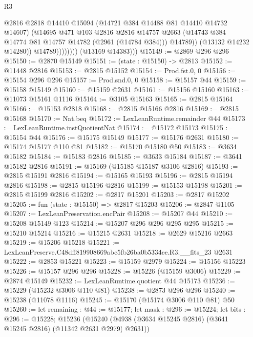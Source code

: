 \begin{lexlean}{R3}
\begin{coremodule}
                            @2816
                            @2818
                            @14410
                            @15094
                            (@14721 @384 @14488 @81 @14410 @14732 @14607)
                            (@14695
                              @471
                              @103
                              @2816
                              @2816
                              @14757
                              @2663
                              (@14743 @384 @14774 @81 @14757 @14782 (@2961 (@14784 @384)))
                              @14789))
                          (@13132 @14232 @14280))
                        @14789))))))))
        (@13169 @14383)))
@15149 := @2869 @296 @296
@15150 := @2870 @15149
@15151 := (state : @15150) -> @2813
@15152 := @11448 @2816
@15153 := @2815 @15152
@15154 := Prod.fst.{0, 0}
@15156 := @15154 @296 @296
@15157 := Prod.snd.{0, 0}
@15158 := @15157 @44
@15159 := @15158 @15149
@15160 := @15159 @2631
@15161 := @15156 @15160
@15163 := @11073 @15161 @1116
@15164 := @3105 @15163
@15165 := @2815 @15164
@15166 := @15153 @2818
@15168 := @2815 @15166 @2816
@15169 := @2815 @15168
@15170 := Nat.beq
@15172 := LexLeanRuntime.remainder @44
@15173 := LexLeanRuntime.instQuotientNat
@15174 := @15172 @15173
@15175 := @15154 @44
@15176 := @15175 @15149
@15177 := @15176 @2631
@15180 := @15174 @15177 @110 @81
@15182 := @15170 @15180 @50
@15183 := @3634 @15182
@15184 := @15183 @2816
@15185 := @3633 @15184
@15187 := @3641 @15182 @2816
@15191 := @15169 (@15185 @15187 @3106 @2816)
@15193 := @2815 @15191 @2816
@15194 := @15165 @15193
@15196 := @2815 @15194 @2816
@15198 := @2815 @15196 @2816
@15199 := @15153 @15198
@15201 := @2815 @15199 @2816
@15202 := @2817 @15201
@15203 := @2817 @15202
@15205 := fun (state : @15150) => @2817 @15203
@15206 := @2847 @1105
@15207 := LexLeanPreservation.encPair
@15208 := @15207 @44
@15210 := @15208 @15149 @123
@15214 := @15207 @296 @296 @295 @295
@15215 := @15210 @15214
@15216 := @15215 @2631
@15218 := @2629 @15216 @2663
@15219 := @15206 @15218
@15221 := LexLeanPreserve.C48dff819908669abc5fb26ba0b5334ce.R3.__fits_23 @2631
@15222 := @2853 @15221
@15223 := @15159 @2979
@15224 := @15156 @15223
@15226 := @15157 @296 @296
@15228 := @15226 (@15159 @3006)
@15229 := @2874 @15149
@15232 := LexLeanRuntime.quotient @44 @15173
@15236 := @15229 (@15232 @3006 @110 @81)
@15238 := @2873 @296 @296
@15240 := @15238 (@11078 @1116)
@15245 := @15170 (@15174 @3006 @110 @81) @50
@15260 := let remaining : @44 := @15177;
  let mask : @296 := @15224;
  let bits : @296 := @15228;
  @15236 (@15240 (@4938 (@3634 @15245 @2816) (@3641 @15245 @2816) (@11342 @2631 @2979) @2631))

\end{coremodule}
\end{lexlean}
